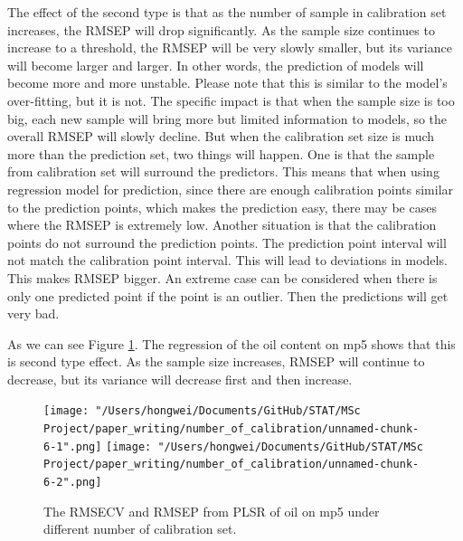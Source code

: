 \documentclass[a4paper,12pt,titlepage]{article} %
\numberwithin{equation}{section}  %
\begin{document}
	The effect of the second type is that as the number of sample in calibration set increases, the RMSEP will drop significantly. As the sample size continues to increase to a threshold, the RMSEP will be very slowly smaller, but its variance will become larger and larger. In other words, the prediction of models will become more and more unstable. Please note that this is similar to the model's over-fitting, but it is not. The specific impact is that when the sample size is too big, each new sample will bring more but limited information to models, so the overall RMSEP will slowly decline. But when the calibration set size is much more than the prediction set, two things will happen. One is that the sample from calibration set will surround the predictors. This means that when using regression model for prediction, since there are enough calibration points similar to the prediction points, which makes the prediction easy, there may be cases where the RMSEP is extremely low. Another situation is that the calibration points do not surround the prediction points. The prediction point interval will not match the calibration point interval. This will lead to deviations in models. This makes RMSEP bigger. An extreme case can be considered when there is only one predicted point if the point is an outlier. Then the predictions will get very bad.
	
	As we can see Figure \ref{fig:sample_2}. The regression of the oil content on mp5 shows that this is second type effect. As the sample size increases, RMSEP will continue to decrease, but its variance will decrease first and then increase.
	
				\begin{figure}[h]    %
		\centering           %
		\texttt{[image: "/Users/hongwei/Documents/GitHub/STAT/MSc Project/paper\_writing/number\_of\_calibration/unnamed-chunk-6-1".png]}  %
		\texttt{[image: "/Users/hongwei/Documents/GitHub/STAT/MSc Project/paper\_writing/number\_of\_calibration/unnamed-chunk-6-2".png]}  %
		\caption{The RMSECV and RMSEP from PLSR of oil on mp5 under different number of calibration set.}          %
		\label{fig:sample_2}               %
	\end{figure}                        %
	
\end{document}
